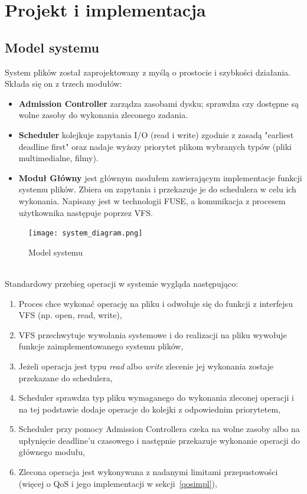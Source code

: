\chapter{Projekt i implementacja} \label{ch:implementation}

\section{Model systemu}

System plików został zaprojektowany z myślą o prostocie i szybkości działania. Składa się on z 
trzech modułów:

\begin{itemize}
	\item \textbf{Admission Controller} zarządza zasobami dysku; sprawdza czy dostępne
	są wolne zasoby do wykonania zleconego zadania.
	
	\item \textbf{Scheduler} kolejkuje zapytania I/O (read i write) zgodnie z zasadą 
	"earliest deadline first"
	oraz nadaje wyższy priorytet plikom wybranych typów (pliki multimedialne, filmy).
	
	\item \textbf{Moduł Główny} jest głównym modułem zawierającym implementacje funkcji systemu
	plików. Zbiera on zapytania i przekazuje je do schedulera w celu ich wykonania. 
	Napisany jest w technologii FUSE, a komunikacja z procesem użytkownika następuje 
	poprzez VFS.
\end{itemize}

\begin{figure}[h!]
	\centering
	\texttt{[image: system\_diagram.png]}
		\caption{Model systemu}
\end{figure}
\ \\

Standardowy przebieg operacji w systemie wygląda następująco:

\begin{enumerate}
	\item Proces chce wykonać operację na pliku i odwołuje się do funkcji z interfejsu
	VFS (np. open, read, write),
	\item VFS przechwytuje wywołania systemowe i do realizacji na pliku wywołuje funkcje
	zaimplementowanego systemu plików,
	\item Jeżeli operacja jest typu \emph{read} albo \emph{write} zlecenie jej wykonania zostaje 
	przekazane do schedulera,
	\item Scheduler sprawdza typ pliku wymaganego do wykonania zleconej operacji i na tej
	podstawie dodaje operacje do kolejki z odpowiednim priorytetem,
	\item Scheduler przy pomocy Admission Controllera czeka na wolne zasoby albo na upłynięcie 
	deadline'u czasowego i następnie przekazuje wykonanie operacji do głównego modułu,
	\item Zlecona operacja jest wykonywana z nadanymi limitami przepustowości 
	(więcej o QoS i jego implementacji w sekcji~\ref{qosimpl}), 
\end{enumerate}

